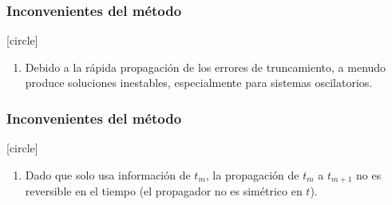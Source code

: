 \begin{frame}
\frametitle{Inconvenientes del método}
[circle]
\begin{enumerate}
\conti
\item Debido a la rápida propagación de los errores de truncamiento, a menudo produce soluciones inestables, especialmente para sistemas oscilatorios.
\seti
\end{enumerate}
\end{frame}
\begin{frame}
\frametitle{Inconvenientes del método}
[circle]
\begin{enumerate}
\conti
\item Dado que solo usa información de $t_{m}$, la propagación de $t_{m}$ a $t_{m + 1}$ no es reversible en el tiempo (el propagador no es simétrico en $t$).
\end{enumerate}
\end{frame}
